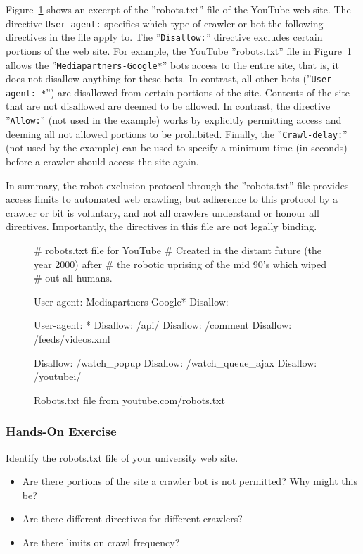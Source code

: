 Figure~\ref{fig:youtuberobots} shows an excerpt of the ''robots.txt'' file of the YouTube web site. The directive \texttt{User-agent:} specifies which type of crawler or bot the following directives in the file apply to. The ''\texttt{Disallow:}'' directive excludes certain portions of the web site. For example, the YouTube ''robots.txt''  file in Figure~\ref{fig:youtuberobots} allows the ''\texttt{Mediapartners-Google*}'' bots access to the entire site, that is, it does not disallow anything for these bots. In contrast, all other bots (''\texttt{User-agent: *}'') are disallowed from certain portions of the site. Contents of the site that are not disallowed are deemed to be allowed. In contrast, the directive ''\texttt{Allow:}'' (not used in the example) works by explicitly permitting access and deeming all not allowed portions to be prohibited. Finally, the ''\texttt{Crawl-delay:}'' (not used by the example) can be used to specify a minimum time (in seconds) before a crawler should access the site again.

In summary, the robot exclusion protocol through the ''robots.txt'' file provides access limits to automated web crawling, but adherence to this protocol by a crawler or bit is voluntary, and not all crawlers understand or honour all directives. Importantly, the directives in this file are not legally binding.

\begin{figure}
\begin{textcode}
# robots.txt file for YouTube
# Created in the distant future (the year 2000) after
# the robotic uprising of the mid 90's which wiped 
# out all humans.

User-agent: Mediapartners-Google*
Disallow:

User-agent: *
Disallow: /api/
Disallow: /comment
Disallow: /feeds/videos.xml

Disallow: /watch_popup
Disallow: /watch_queue_ajax
Disallow: /youtubei/
\end{textcode}
\caption[Example robots.txt file]{Robots.txt file from \url{youtube.com/robots.txt}}
\label{fig:youtuberobots}
\end{figure}

\begin{tcolorbox}[colback=code]
\subsubsection*{Hands-On Exercise}
Identify the robots.txt file of your university web site.
\begin{itemize}
  \item Are there portions of the site a crawler bot is not permitted? Why might this be?
  \item Are there different directives for different crawlers?
  \item Are there limits on crawl frequency?
\end{itemize}
\end{tcolorbox}

